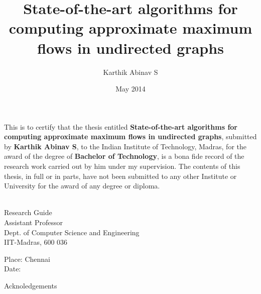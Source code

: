 \documentclass[BTech]{iitmdiss}
\def\thesistitle{State-of-the-art algorithms for computing approximate maximum flows in undirected graphs}
\def\thesisauthor{Karthik Abinav S}
\begin{document}


\title{\thesistitle}

\author{\thesisauthor}

\date{May 2014}

\begin{singlespace}
\maketitle 
\end{singlespace} 



\certificate

\vspace*{0.5in}

\noindent This is to certify that the thesis entitled {\bf {\thesistitle}}, 
submitted by {\bf {\thesisauthor}}, to the Indian Institute of Technology, 
Madras, for the award of the degree of {\bf Bachelor of Technology}, 
is a bona fide record of the research work carried out by him under my
supervision. The contents of this thesis, in full or in parts, have not been
submitted to any other Institute or University for the award of any degree or
diploma.

\vspace*{1.4in}
\hspace*{-0.25in}
\begin{singlespace}
 \\
\noindent Research Guide \\ 
\noindent Assistant Professor \\
\noindent Dept. of Computer Science and Engineering\\
\noindent IIT-Madras, 600 036 \\
\end{singlespace}
\vspace*{0.20in}
\noindent Place: Chennai\\ 
Date:

\acknowledgements

Acknoledgements

\end{document}
